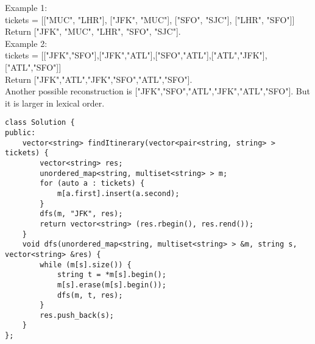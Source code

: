 Example 1:\\
tickets = [["MUC", "LHR"], ["JFK", "MUC"], ["SFO", "SJC"], ["LHR", "SFO"]]\\
Return ["JFK", "MUC", "LHR", "SFO", "SJC"].\\

Example 2:\\
tickets = [["JFK","SFO"],["JFK","ATL"],["SFO","ATL"],["ATL","JFK"],["ATL","SFO"]]\\
Return ["JFK","ATL","JFK","SFO","ATL","SFO"].\\
Another possible reconstruction is ["JFK","SFO","ATL","JFK","ATL","SFO"]. But it is larger in lexical order. \\

\begin{lstlisting}
class Solution {
public:
    vector<string> findItinerary(vector<pair<string, string> > tickets) {
        vector<string> res;
        unordered_map<string, multiset<string> > m;
        for (auto a : tickets) {
            m[a.first].insert(a.second);
        }
        dfs(m, "JFK", res);
        return vector<string> (res.rbegin(), res.rend());
    }
    void dfs(unordered_map<string, multiset<string> > &m, string s, vector<string> &res) {
        while (m[s].size()) {
            string t = *m[s].begin();
            m[s].erase(m[s].begin());
            dfs(m, t, res);
        }
        res.push_back(s);
    }
};
\end{lstlisting}

